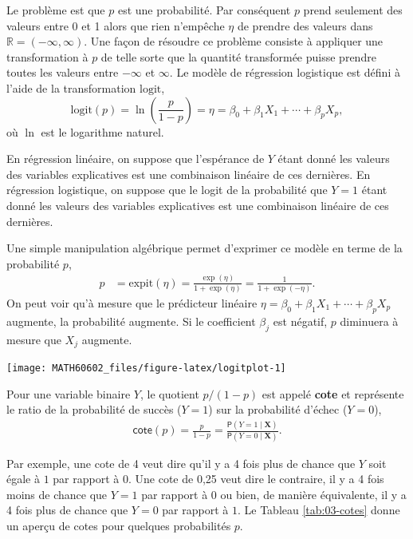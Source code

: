 \documentclass[
  11pt,
  letterpaper,
]{book}
\theoremstyle{definition}
\theoremstyle{definition}
\theoremstyle{definition}
\theoremstyle{remark}
\begin{document}
Le problème est que \(p\) est une probabilité. Par conséquent \(p\) prend seulement des valeurs entre 0 et 1 alors que rien n'empêche \(\eta\) de prendre des valeurs dans \(\mathbb{R}=(-\infty, \infty)\). Une façon de résoudre ce problème consiste à appliquer une transformation à \(p\) de telle sorte que la quantité transformée puisse prendre toutes les valeurs entre \(-\infty\) et \(\infty\).
Le modèle de régression logistique est défini à l'aide de la transformation \(\mathrm{logit}\),
\[\mathrm{logit}(p) = \ln\left( \frac{p}{1-p}\right)=\eta=\beta_0 + \beta_1X_1 + \cdots + \beta_p X_p,\]
où \(\ln\) est le logarithme naturel.

En régression linéaire, on suppose que l'espérance de \(Y\) étant donné les valeurs des variables explicatives est une combinaison linéaire de ces dernières. En régression logistique, on suppose que le logit de la probabilité que \(Y=1\) étant donné les valeurs des variables explicatives est une combinaison linéaire de ces dernières.

Une simple manipulation algébrique permet d'exprimer ce modèle en terme de la probabilité \(p\),
\begin{align*}
 p &= \mathrm{expit}(\eta) = \frac{\exp(\eta)}{1+\exp(\eta)}
= \frac{1}{1+\exp(-\eta)}.
\end{align*}
On peut voir qu'à mesure que le prédicteur linéaire \(\eta=\beta_0+\beta_1X_1 + \cdots + \beta_pX_p\) augmente, la probabilité augmente.
Si le coefficient \(\beta_j\) est négatif, \(p\) diminuera à mesure que \(X_j\) augmente.

\begin{center}\texttt{[image: MATH60602\_files/figure-latex/logitplot-1]} \end{center}

Pour une variable binaire \(Y\), le quotient \(p/(1-p)\) est appelé \textbf{cote} et représente le ratio de la probabilité de succès (\(Y=1\)) sur la probabilité d'échec (\(Y=0\)),
\begin{align*}
 \mathsf{cote}(p) = \frac{p}{1-p} = \frac{{\mathsf P}\left(Y=1 \mid \boldsymbol{X}\right)}{{\mathsf P}\left(Y=0 \mid \boldsymbol{X}\right)}.
\end{align*}

Par exemple, une cote de 4 veut dire qu'il y a 4 fois plus de chance que \(Y\) soit égale à \(1\) par rapport à \(0\). Une cote de 0,25 veut dire le contraire, il y a 4 fois moins de chance que \(Y=1\) par rapport à \(0\) ou bien, de manière équivalente, il y a 4 fois plus de chance que \(Y=0\) par rapport à \(1\). Le Tableau \ref{tab:03-cotes} donne un aperçu de cotes pour quelques probabilités \(p\).
\end{document}
